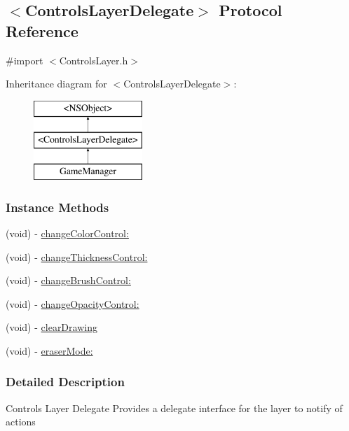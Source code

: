 \hypertarget{protocol_controls_layer_delegate-p}{\subsection{$<$Controls\-Layer\-Delegate$>$ Protocol Reference}
\label{db/d3c/protocol_controls_layer_delegate-p}
}


{\ttfamily \#import $<$Controls\-Layer.\-h$>$}

Inheritance diagram for $<$Controls\-Layer\-Delegate$>$\-:\begin{figure}[H]
\begin{center}
\leavevmode
\includegraphics[height=3.000000cm]{db/d3c/protocol_controls_layer_delegate-p}
\end{center}
\end{figure}
\subsubsection*{Instance Methods}
\begin{DoxyCompactItemize}
\item 
(void) -\/ \hyperlink{protocol_controls_layer_delegate-p_ae43a35a6ddca486c0ddbe044d4e59c6a}{change\-Color\-Control\-:}
\item 
(void) -\/ \hyperlink{protocol_controls_layer_delegate-p_ae067b1264299a12d48213857ab3df45e}{change\-Thickness\-Control\-:}
\item 
(void) -\/ \hyperlink{protocol_controls_layer_delegate-p_a74beabc6dd814b96172efa611058759c}{change\-Brush\-Control\-:}
\item 
(void) -\/ \hyperlink{protocol_controls_layer_delegate-p_ad4fc244191c678ef9b27a2ffdb00a70a}{change\-Opacity\-Control\-:}
\item 
(void) -\/ \hyperlink{protocol_controls_layer_delegate-p_a6dc6c910f8147fd574e24f4f6e1cd48d}{clear\-Drawing}
\item 
(void) -\/ \hyperlink{protocol_controls_layer_delegate-p_a652a78380947aba4783ddfb6e153287d}{eraser\-Mode\-:}
\end{DoxyCompactItemize}


\subsubsection{Detailed Description}
Controls Layer Delegate Provides a delegate interface for the layer to notify of actions 

